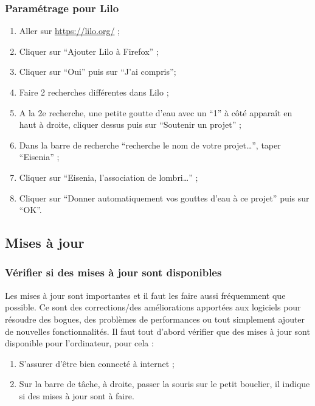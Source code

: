 \documentclass[12pt]{article}
\begin{document}
        \subsubsection{Paramétrage pour Lilo}
            \begin{enumerate}
                \item Aller sur \href{https://lilo.org/}{https://lilo.org/} ;
                \item Cliquer sur “Ajouter Lilo à Firefox” ;
                \item Cliquer sur “Oui” puis sur “J’ai compris”;
                \item Faire 2 recherches différentes dans Lilo ;
                \item A la 2e recherche, une petite goutte d’eau avec un “1” à côté apparaît en haut à droite, cliquer dessus puis sur “Soutenir un projet” ;
                \item Dans la barre de recherche “recherche le nom de votre projet…”, taper “Eisenia” ;
                \item Cliquer sur “Eisenia, l’association de lombri…” ;
                \item Cliquer sur “Donner automatiquement vos gouttes d’eau à ce projet” puis sur “OK”.
            \end{enumerate}
    \subsection{Mises à jour}
        \subsubsection{Vérifier si des mises à jour sont disponibles}
            Les mises à jour sont importantes et il faut les faire aussi fréquemment que possible. Ce sont des corrections/des améliorations apportées aux logiciels pour résoudre des bogues, des problèmes de performances ou tout simplement ajouter de nouvelles fonctionnalités.\newline
            Il faut tout d'abord vérifier que des mises à jour sont disponible pour l'ordinateur, pour cela :
            \begin{enumerate}
                \item S'assurer d'être bien connecté à internet ;
                \item Sur la barre de tâche, à droite, passer la souris sur le petit bouclier, il indique si des mises à jour sont à faire.
            \end{enumerate}
\end{document}

